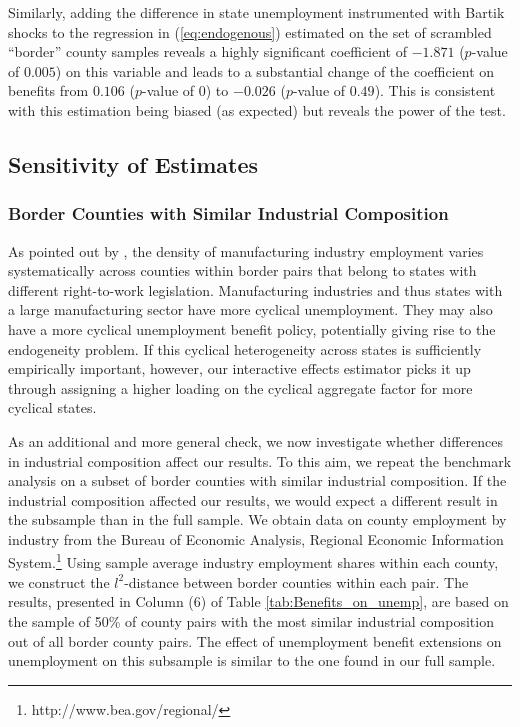 \documentclass[12pt]{article}
\newcommand{\1}{\mathbf{1}}
\begin{document}
Similarly, adding the difference in state unemployment instrumented with Bartik shocks to the regression in (\ref{eq:endogenous}) estimated on the set of scrambled  ``border'' county samples reveals a highly significant coefficient of $-1.871$ ($p$-value of $0.005$) on this variable and leads to a substantial change of the coefficient on benefits from $0.106$ ($p$-value of $0$) to $-0.026$ ($p$-value of $0.49$). This is consistent with this estimation being biased (as expected) but reveals the power of the test.







\subsection{Sensitivity of Estimates}


\subsubsection{Border Counties with Similar Industrial Composition}
As pointed out by \citet{holmes:98}, the density of manufacturing industry employment varies systematically across counties within border pairs that belong to states with different right-to-work legislation. Manufacturing industries and thus states with a large manufacturing sector have more cyclical unemployment. They may also have a more cyclical unemployment benefit policy, potentially giving rise to the endogeneity problem. If this cyclical heterogeneity across states is sufficiently empirically important, however, our interactive effects estimator picks it up through assigning a higher loading on the cyclical aggregate factor for more cyclical states.

As an additional and more general check, we now investigate whether differences in industrial composition affect our results. To this aim, we repeat the benchmark analysis on a subset of border counties with similar industrial composition.  If the industrial composition affected our results, we would expect a different result in the subsample than in the full sample. We obtain data on county employment by industry from the Bureau of Economic Analysis, Regional Economic Information System.\footnote{http://www.bea.gov/regional/}  Using sample average industry employment shares within each county, we construct the $l^2$-distance between border counties within each pair. The results, presented in Column (6) of Table \ref{tab:Benefits_on_unemp}, are based on the sample of 50\% of county pairs with the most similar industrial composition out of all border county pairs. The effect of unemployment benefit extensions on unemployment on this subsample is similar to the one found in our full sample.
\end{document}

